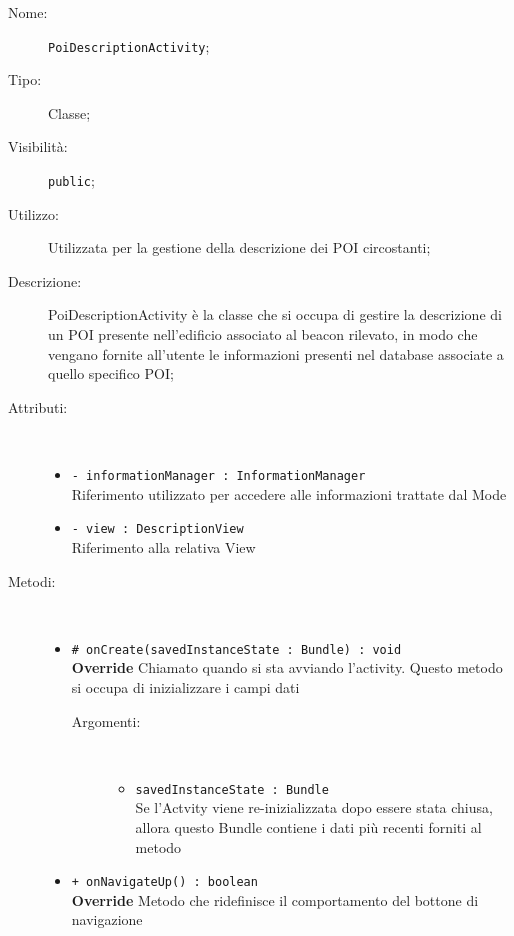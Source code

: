 \documentclass[../DefinizioneDiProdotto.tex]{subfiles}
\begin{document}
\begin{description}
	\item[Nome:] \texttt{PoiDescriptionActivity};
	\item[Tipo:] Classe;
	\item[Visibilità:] \texttt{public};
	\item[Utilizzo:] Utilizzata per la gestione della descrizione dei POI circostanti;
	\item[Descrizione:] PoiDescriptionActivity è la classe che si occupa di gestire la descrizione di un POI presente nell'edificio associato al beacon rilevato, in modo che vengano fornite all'utente le informazioni presenti nel database associate a quello specifico POI;
	\item[Attributi:] \
	\begin{itemize}
		\item \texttt{- informationManager : InformationManager}\\
		Riferimento utilizzato per accedere alle informazioni trattate dal Mode
		
		\item \texttt{- view : DescriptionView}\\
		Riferimento alla relativa View
		
	\end{itemize}
	\item[Metodi:] \
	\begin{itemize}
		\item \texttt{\# onCreate(savedInstanceState : Bundle) : void}\\
		\textbf{Override} Chiamato quando si sta avviando l'activity. Questo metodo si occupa di inizializzare i campi dati
		\begin{description}
			\item[Argomenti:] \
			\begin{itemize}
				\item \texttt{savedInstanceState : Bundle}\\
				Se l'Actvity viene re-inizializzata dopo essere stata chiusa, allora questo Bundle contiene i dati più recenti forniti al metodo\end{itemize}
		\end{description}
		\item \texttt{+ onNavigateUp() : boolean}\\
		\textbf{Override} Metodo che ridefinisce il comportamento del bottone di navigazione
	\end{itemize}
\end{description}
\end{document}
